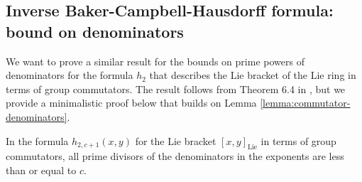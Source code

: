 \subsection{Inverse Baker-Campbell-Hausdorff formula: bound on denominators}\label{sec:lie-bracket-ito-group-commutator}

We want to prove a similar result for the bounds on prime powers of
denominators for the formula $h_2$ that describes the Lie bracket of
the Lie ring in terms of group commutators. The result follows from
Theorem 6.4 in \cite{Lazardeffective}, but we provide a minimalistic
proof below that builds on Lemma \ref{lemma:commutator-denominators}.

\begin{lemma}\label{lemma:lie-bracket-denominators}
  In the formula $h_{2,c + 1}(x,y)$ for the Lie bracket
  $[x,y]_{\text{Lie}}$ in terms of group commutators, all prime
  divisors of the denominators in the exponents are less than or equal
  to $c$.
\end{lemma}

